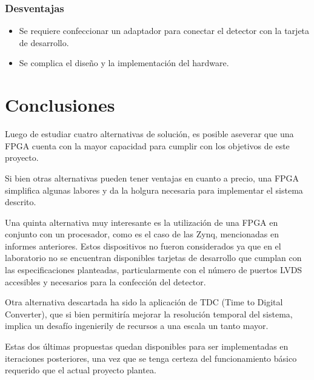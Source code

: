 \subsubsection*{Desventajas}
\begin{itemize}
    \item Se requiere confeccionar un adaptador para conectar el detector con la tarjeta de desarrollo.
    \item Se complica el diseño y la implementación del hardware.
\end{itemize}




\newpage
\section{Conclusiones}
\par Luego de estudiar cuatro alternativas de solución, es posible aseverar que una FPGA cuenta con la mayor capacidad para cumplir con los objetivos de este proyecto.
\par Si bien otras alternativas pueden tener ventajas en cuanto a precio, una FPGA simplifica algunas labores y da la holgura necesaria para implementar el sistema descrito.
\par Una quinta alternativa muy interesante es la utilización de una FPGA en conjunto con un procesador, como es el caso de las Zynq, mencionadas en informes anteriores. Estos dispositivos no fueron considerados ya que en el laboratorio no se encuentran disponibles tarjetas de desarrollo que cumplan con las especificaciones planteadas, particularmente con el número de puertos LVDS accesibles y necesarios para la confección del detector.
\par Otra alternativa descartada ha sido la aplicación de TDC (Time to Digital Converter)\cite{Arpin2010AResources}, que si bien permitiría mejorar la resolución temporal del sistema, implica un desafío ingenierily de recursos a una escala un tanto mayor.
\par Estas dos últimas propuestas quedan disponibles para ser implementadas en iteraciones posteriores, una vez que se tenga certeza del funcionamiento básico requerido que el actual proyecto plantea.
